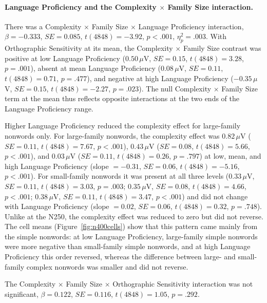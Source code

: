 \documentclass[utf8]{FrontiersinHarvard} %
\begin{document}
\paragraph*{Language Proficiency and the Complexity $\times$ Family Size interaction.} There was a Complexity $\times$ Family Size $\times$ Language Proficiency interaction, $\beta = -0.333$, $SE = 0.085$, $t(4848) = -3.92$, $p < .001$, $\eta^2_p = .003$. With Orthographic Sensitivity at its mean, the Complexity $\times$ Family Size contrast was positive at low Language Proficiency ($0.50\,\mu$V, $SE = 0.15$, $t(4848) = 3.28$, $p = .001$), absent at mean Language Proficiency ($0.08\,\mu$V, $SE = 0.11$, $t(4848) = 0.71$, $p = .477$), and negative at high Language Proficiency ($-0.35\,\mu$V, $SE = 0.15$, $t(4848) = -2.27$, $p = .023$). The null Complexity $\times$ Family Size term at the mean thus reflects opposite interactions at the two ends of the Language Proficiency range.

Higher Language Proficiency reduced the complexity effect for large-family nonwords only. For large-family nonwords, the complexity effect was $0.82\,\mu$V ($SE = 0.11$, $t(4848) = 7.67$, $p < .001$), $0.43\,\mu$V ($SE = 0.08$, $t(4848) = 5.66$, $p < .001$), and $0.03\,\mu$V ($SE = 0.11$, $t(4848) = 0.26$, $p = .797$) at low, mean, and high Language Proficiency (slope $= -0.31$, $SE = 0.06$, $t(4848) = -5.16$, $p < .001$). For small-family nonwords it was present at all three levels ($0.33\,\mu$V, $SE = 0.11$, $t(4848) = 3.03$, $p = .003$; $0.35\,\mu$V, $SE = 0.08$, $t(4848) = 4.66$, $p < .001$; $0.38\,\mu$V, $SE = 0.11$, $t(4848) = 3.47$, $p < .001$) and did not change with Language Proficiency (slope $= 0.02$, $SE = 0.06$, $t(4848) = 0.32$, $p = .748$). Unlike at the N250, the complexity effect was reduced to zero but did not reverse. The cell means (Figure~\ref{fig:n400cells}) show that this pattern came mainly from the simple nonwords: at low Language Proficiency, large-family simple nonwords were more negative than small-family simple nonwords, and at high Language Proficiency this order reversed, whereas the difference between large- and small-family complex nonwords was smaller and did not reverse.

The Complexity $\times$ Family Size $\times$ Orthographic Sensitivity interaction was not significant, $\beta = 0.122$, $SE = 0.116$, $t(4848) = 1.05$, $p = .292$.
\end{document}

